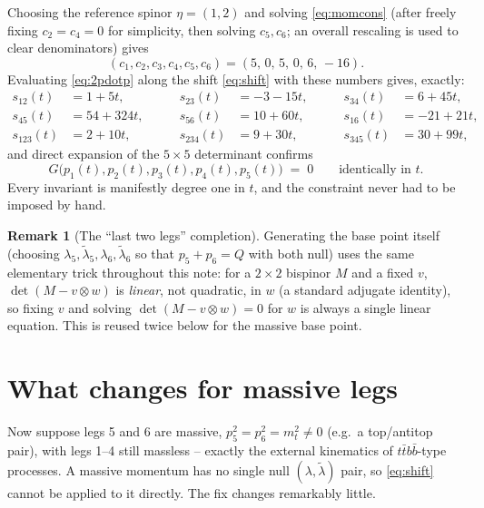 \documentclass[11pt]{article}
\newcommand{\lam}{\lambda}
\newcommand{\lt}{\tilde\lambda}
\theoremstyle{definition}
\newtheorem{remark}{Remark}
\begin{document}
Choosing the reference spinor $\eta=(1,2)$ and solving \eqref{eq:momcons} (after freely fixing
$c_2=c_4=0$ for simplicity, then solving $c_5,c_6$; an overall rescaling is used to clear
denominators) gives
\begin{equation}
(c_1,c_2,c_3,c_4,c_5,c_6) = (5,\,0,\,5,\,0,\,6,\,-16).
\end{equation}
Evaluating \eqref{eq:2pdotp} along the shift \eqref{eq:shift} with these numbers gives, exactly:
\begin{equation}
\begin{alignedat}{3}
s_{12}(t) &= 1 + 5t, &\qquad s_{23}(t) &= -3 - 15t, &\qquad s_{34}(t) &= 6+45t,\\
s_{45}(t) &= 54+324t, &\qquad s_{56}(t) &= 10+60t, &\qquad s_{16}(t) &= -21+21t,\\
s_{123}(t) &= 2+10t, &\qquad s_{234}(t) &= 9+30t, &\qquad s_{345}(t) &= 30+99t,
\end{alignedat}
\end{equation}
and direct expansion of the $5\times5$ determinant confirms
\begin{equation}
G\big(p_1(t),p_2(t),p_3(t),p_4(t),p_5(t)\big) \;=\; 0 \qquad \text{identically in } t.
\end{equation}
Every invariant is manifestly degree one in $t$, and the constraint never had to be imposed by
hand.

\begin{remark}[The ``last two legs'' completion]
\label{rem:completion}
Generating the base point itself (choosing $\lam_5,\lt_5,\lam_6,\lt_6$ so that $p_5+p_6=Q$ with
both null) uses the same elementary trick throughout this note: for a $2\times2$ bispinor $M$ and
a fixed $v$, $\det(M - v\otimes w)$ is \emph{linear}, not quadratic, in $w$ (a standard adjugate
identity), so fixing $v$ and solving $\det(M-v\otimes w)=0$ for $w$ is always a single linear
equation. This is reused twice below for the massive base point.
\end{remark}

\section{What changes for massive legs}

Now suppose legs 5 and 6 are massive, $p_5^2=p_6^2=m_t^2\neq0$ (e.g.\ a top/antitop pair), with
legs 1--4 still massless -- exactly the external kinematics of $t\bar t b\bar b$-type processes.
A massive momentum has no single null $(\lam,\lt)$ pair, so \eqref{eq:shift} cannot be applied to
it directly. The fix changes remarkably little.
\end{document}
